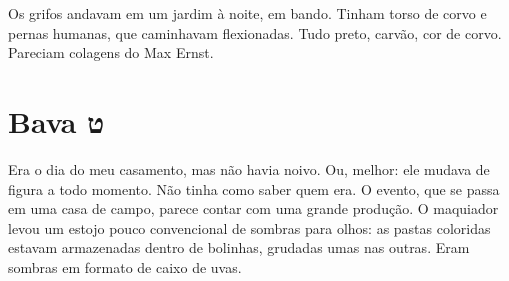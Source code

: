 Os grifos andavam em um jardim à noite, em bando. Tinham torso de corvo e pernas humanas, que caminhavam flexionadas. Tudo preto, carvão, cor de corvo. Pareciam colagens do Max Ernst.

\chapter*{Bava ט\smallskip{}}

Era o dia do meu casamento, mas não havia noivo. Ou, melhor: ele mudava de figura a todo momento. Não tinha como saber quem era. O evento, que se passa em uma casa de campo, parece contar com uma grande produção. O maquiador levou um estojo pouco convencional de sombras para olhos: as pastas coloridas estavam armazenadas dentro de bolinhas, grudadas umas nas outras. Eram sombras em formato de caixo de uvas.

